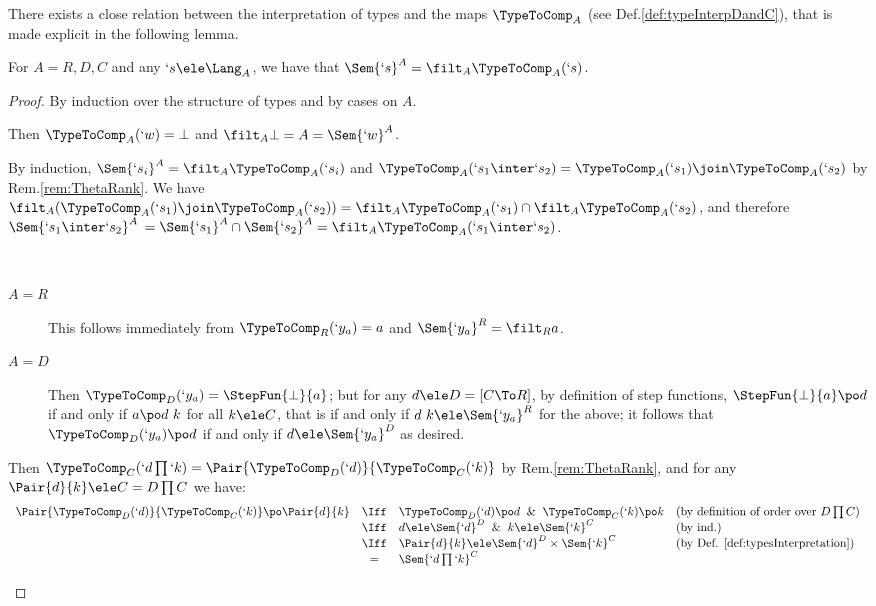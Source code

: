 \documentclass{lmcs}
\begin{document}
There exists a close relation between the interpretation of types and the maps $\TypeToComp_A$ (see Def.\skp\ref{def:typeInterpDandC}), that is made explicit in the following lemma.

 \begin{lem} \label{lem:typeInterpCompactCone}
 For $A=R,D,C$ and any $`s \ele \Lang_A$, we have that $\Sem{ `s}^A = \filt_A \TypeToComp_A(`s)$.
 \end{lem}

 \begin{proof}
 By induction over the structure of types and by cases on $A$. 

 \begin{description} \itemsep 2pt
 \item [$ `s \equiv `w $] 
Then $\TypeToComp_A(`w) = \bot$ and $\filt_A \bot = A = \Sem{ `w}^A$.

 \item [$ `s \equiv `s_1 \inter`s_2 $] 
By induction, $\Sem{ `s_i}^A = \filt_A \TypeToComp_A(`s_i)$ and $\TypeToComp_A(`s_1 \inter`s_2) = \TypeToComp_A(`s_1) \join \TypeToComp_A(`s_2)$ by Rem.\skp\ref{rem:ThetaRank}. 
We have $\filt_A(\TypeToComp_A(`s_1) \join \TypeToComp_A(`s_2)) = \filt_A\TypeToComp_A(`s_1) \cap \filt_A\TypeToComp_A(`s_2)$, and therefore $\Sem{ `s_1 \inter`s_2}^A$ $= \Sem{ `s_1}^A \cap \Sem{ `s_2}^A = \filt_A \TypeToComp_A(`s_1 \inter`s_2) $.
	
 \item [$ `s \equiv `y_a $] ~

 \begin{description} 
 \item [$A = R$]
This follows immediately from $\TypeToComp_R(`y_a) = a$ and $\Sem{ `y_a}^R = \filt_R a$.
	
 \item[$A = D$]
Then $\TypeToComp_D(`y_a) = \StepFun{\bot}{a}$; but for any $d \ele D = [C \To R]$, by definition of step functions, $\StepFun{\bot}{a} \po d$ if and only if $a \po d \ k$ for all $k \ele C$, that is if and only if $d \ k \ele \Sem{ `y_a}^R$ for the above; it follows that $\TypeToComp_D(`y_a) \po d$ if and only if $d \ele \Sem{`y_a}^D$ as desired.

 \end{description} 

 \item [$ `s \equiv `d\prod `k $] 
Then $\TypeToComp_C(`d\prod `k) = \Pair{\TypeToComp_D(`d)}{\TypeToComp_C(`k)}$ by Rem.\skp\ref{rem:ThetaRank}, and for any
$ \Pair{d}{k} \ele C = D\prod C$ we have:
%
 \[ \begin{array}{lcll}
\Pair{\TypeToComp_D(`d)}{\TypeToComp_C(`k)} \po \Pair{d}{k} 
	& \Iff &
\TypeToComp_D(`d) \po d \And \TypeToComp_C(`k) \po k 
		& (\textrm{by definition of order over } D\prod C ) \\
	& \Iff & 
d \ele \Sem{`d}^D \And k \ele \Sem{`k}^C 
		& (\textrm{by ind.}) \\
	& \Iff & 
\Pair{d}{k} \ele \Sem{`d}^D \times \Sem{ `k }^C 
		& (\textrm{by Def. \ref{def:typesInterpretation}}) \\
	&=& 
\Sem{ `d\prod `k }^C 


\end{array}\]
\end{description}
\end{proof}
\end{document}
